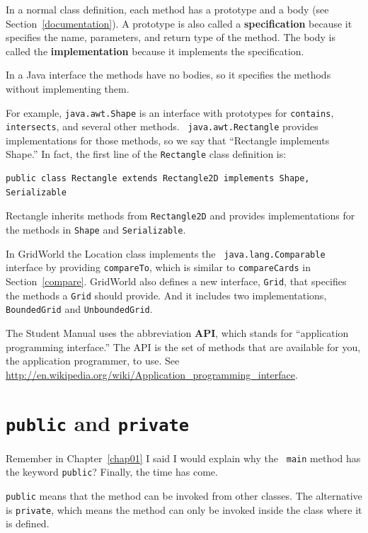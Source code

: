 In a normal class definition, each method has a prototype and a
body (see Section~\ref{documentation}).  A prototype is also called a
{\bf specification} because it specifies the name, parameters, and
return type of the method. The body is called the {\bf implementation}
because it implements the specification.

In a Java interface the methods have no bodies, so it specifies
the methods without implementing them.

For example, {\tt java.awt.Shape} is an interface with prototypes for
{\tt contains}, {\tt intersects}, and several other methods.  {\tt
  java.awt.Rectangle} provides implementations for those methods, so
we say that ``Rectangle implements Shape.''  In fact, the first line
of the {\tt Rectangle} class definition is:

\begin{lstlisting}
public class Rectangle extends Rectangle2D implements Shape, Serializable
\end{lstlisting}

Rectangle inherits methods from {\tt Rectangle2D} and provides
implementations for the methods in {\tt Shape} and {\tt Serializable}.

In GridWorld the Location class implements the {\tt
  java.lang.Comparable} interface by providing {\tt compareTo}, which
is similar to {\tt compareCards} in Section~\ref{compare}.
%
GridWorld also defines a new interface, {\tt Grid}, that specifies
the methods a {\tt Grid} should provide.  And it includes two
implementations, {\tt BoundedGrid} and {\tt UnboundedGrid}.

The Student Manual uses the abbreviation {\bf API}, which stands for
``application programming interface.''  The API is the set of methods
that are available for you, the application programmer, to use.  See
\url{http://en.wikipedia.org/wiki/Application_programming_interface}.


\section{{\tt public} and {\tt private}}

Remember in Chapter~\ref{chap01} I said I would explain why the {\tt
  main} method has the keyword {\tt public}?  Finally, the time has
come.

{\tt public} means that the method can be invoked from other classes.
The alternative is {\tt private}, which means the method can only
be invoked inside the class where it is defined.


